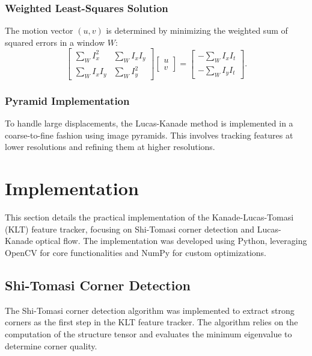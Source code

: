 \documentclass[11pt, conference, letterpaper]{IEEEtran}
\begin{document}
\subsubsection{Weighted Least-Squares Solution}
The motion vector \((u, v)\) is determined by minimizing the weighted sum of squared errors in a window \(W\):
\begin{equation}
\begin{bmatrix}
\sum_W I_x^2 & \sum_W I_x I_y \\
\sum_W I_x I_y & \sum_W I_y^2
\end{bmatrix}
\begin{bmatrix}
u \\
v
\end{bmatrix}
=
\begin{bmatrix}
-\sum_W I_x I_t \\
-\sum_W I_y I_t
\end{bmatrix}.
\end{equation}
\bigskip

\subsubsection{Pyramid Implementation}
To handle large displacements, the Lucas-Kanade method is implemented in a coarse-to-fine fashion using image pyramids. This involves tracking features at lower resolutions and refining them at higher resolutions.


\section{Implementation}
This section details the practical implementation of the Kanade-Lucas-Tomasi (KLT) feature tracker, focusing on Shi-Tomasi corner detection and Lucas-Kanade optical flow. The implementation was developed using Python, leveraging OpenCV for core functionalities and NumPy for custom optimizations.

\subsection{Shi-Tomasi Corner Detection}
The Shi-Tomasi corner detection algorithm was implemented to extract strong corners as the first step in the KLT feature tracker. The algorithm relies on the computation of the structure tensor and evaluates the minimum eigenvalue to determine corner quality.
\end{document}
